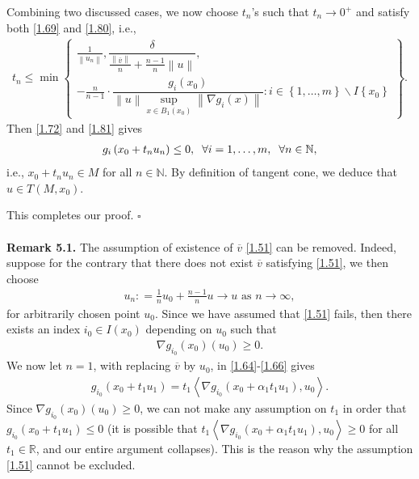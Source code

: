 \documentclass[a4paper]{article}
\numberwithin{equation}{section}
\begin{document}
\begin{enumerate}
Combining two discussed cases, we now choose $t_n$'s such that $t_n\to 0^+$ and satisfy both \eqref{1.69} and \eqref{1.80}, i.e.,
\begin{align}
{t_n} \le \min \left\{ \begin{array}{l}
\frac{1}{{\left\| {{u_n}} \right\|}},\dfrac{\delta }{{\frac{{\left\| {\overline v } \right\|}}{n} + \frac{{n - 1}}{n}\left\| u \right\|}},\\
 - \frac{n}{{n - 1}} \cdot \dfrac{{{g_i}\left( {{x_0}} \right)}}{{\left\| u \right\|\mathop {\sup }\limits_{x \in {B_1}\left( {{x_0}} \right)} \left\| {\nabla {g_i}\left( x \right)} \right\|}}:i \in \left\{ {1, \ldots ,m} \right\}\backslash I\left\{ {{x_0}} \right\}
\end{array} \right\}.
\end{align}
Then \eqref{1.72} and \eqref{1.81} gives
\begin{align}
{g_i}\left( {{x_0} + {t_n}{u_n}} \right) \le 0, \hspace{0.2cm} \forall i = 1, \ldots ,m, \hspace{0.2cm} \forall n \in \mathbb{N},
\end{align}
i.e., ${x_0} + {t_n}{u_n} \in M$ for all $n\in \mathbb{N}$. By definition of tangent cone, we deduce that $u\in T\left(M,x_0\right)$.
\end{enumerate}
This completes our proof. \hfill $\square$\\
\\
\textbf{Remark 5.1.} The assumption of existence of $\overline v$ \eqref{1.51} can be removed. Indeed, suppose for the contrary that there does not exist $\overline v$ satisfying \eqref{1.51}, we then choose 
\begin{align}
{u_n}: = \frac{1}{n}{u_0} + \frac{{n - 1}}{n}u \to u \mbox{ as } n \to \infty ,
\end{align}
for arbitrarily chosen point $u_0$. Since we have assumed that \eqref{1.51} fails, then there exists an index $i_0\in I\left(x_0\right)$ depending on $u_0$ such that 
\begin{align}
\nabla {g_{{i_0}}}\left( {{x_0}} \right)\left( {{u_0}} \right) \ge 0.
\end{align}
We now let $n=1$, with replacing $\overline v$ by $u_0$, in \eqref{1.64}-\eqref{1.66} gives
\begin{align}
{g_{{i_0}}}\left( {{x_0} + {t_1}{u_1}} \right) = {t_1}\left\langle {\nabla {g_{{i_0}}}\left( {{x_0} + {\alpha _1}{t_1}{u_1}} \right),u_0 } \right\rangle .
\end{align}
Since $\nabla {g_{{i_0}}}\left( {{x_0}} \right)\left( {{u_0}} \right) \ge 0$, we can not make any assumption on $t_1$ in order that ${g_{{i_0}}}\left( {{x_0} + {t_1}{u_1}} \right) \le 0$ (it is possible that ${t_1}\left\langle {\nabla {g_{{i_0}}}\left( {{x_0} + {\alpha _1}{t_1}{u_1}} \right),{u_0}} \right\rangle  \ge 0$ for all $t_1\in \mathbb{R}$, and our entire argument collapses). This is the reason why the assumption \eqref{1.51} cannot be excluded.\\
\end{document}
